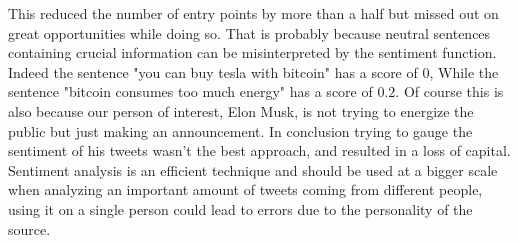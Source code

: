 \documentclass[twoside]{report}
\begin{document}
\begin{spacing}{1}
This reduced the number of entry points by more than a half but missed out on great opportunities while doing so. That is probably because neutral sentences containing crucial information can be misinterpreted by the sentiment function. Indeed the sentence "you can buy tesla with bitcoin" has a score of $0$, While the sentence "bitcoin consumes too much energy" has a score of $0.2$. Of course this is also because our person of interest, Elon Musk, is not trying to energize the public but just making an announcement. In conclusion trying to gauge the sentiment of his tweets wasn't the best approach, and resulted in a loss of capital.
Sentiment analysis is an efficient technique and should be used at a bigger scale when analyzing an important amount of tweets coming from different people, using it on a single person could lead to errors due to the personality of the source.


\end{spacing}
\end{document}
